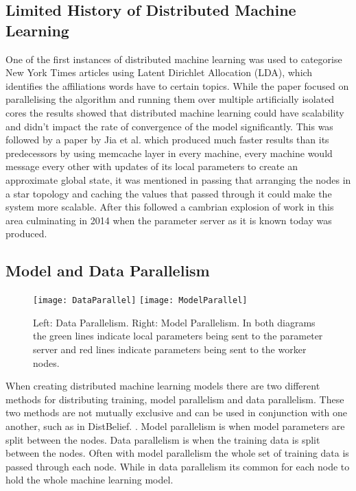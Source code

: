 \subsection{Limited History of Distributed Machine Learning}


One of the first instances of distributed machine learning was used to
categorise New York Times articles using Latent Dirichlet Allocation (LDA),
which identifies the affiliations words have to certain topics.
\cite{newman2008distributed} While the paper focused on parallelising the
algorithm and running them over multiple artificially isolated cores the results
showed that distributed machine learning could have scalability and didn’t
impact the rate of convergence of the model significantly. This was followed by
a paper by Jia et al. \cite{ParallelTopicModels} which produced much faster
results than its predecessors by using memcache layer in every machine, every
machine would message every other with updates of its local parameters
to create an approximate global state, it was mentioned in passing that
arranging the nodes in a star topology and caching the values that passed
through it could make the system more scalable. After this followed a cambrian
explosion of work in this area \cite{Ahmed2012YahooLDA, li2014communication,
Dean2012Distbelief, googlemapreduce2008} culminating in 2014 when the parameter
server as it is known today \cite{LI2014ParameterServers} was produced.


\subsection{Model and Data Parallelism}
\begin{figure}[h]
    \centering
    \texttt{[image: DataParallel]}
    \texttt{[image: ModelParallel]}
    \caption{Left: Data Parallelism. Right: Model Parallelism. In both diagrams
        the green lines indicate local parameters being sent to the parameter
        server and red lines indicate parameters being sent to the worker nodes.}
\end{figure}
When creating distributed machine learning models there are two different methods
for distributing training, model parallelism and data parallelism. These two
methods are not mutually exclusive and can be used in conjunction with one
another, such as in DistBelief. \cite{Dean2012Distbelief}. Model parallelism is
when model parameters are split between the nodes. Data parallelism is when
the training data is split between the nodes. \cite{Xing2015Petuum} Often with model
parallelism the whole set of training data is passed through each node. While in
data parallelism its common for each node to hold the whole machine learning
model.

